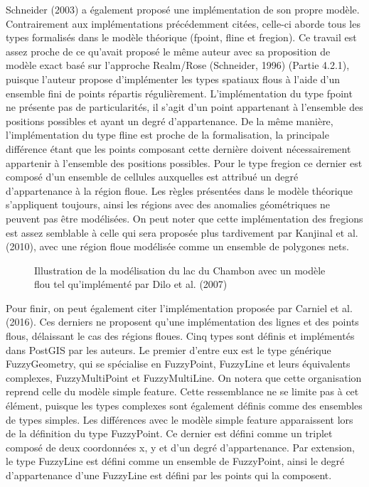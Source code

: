 Schneider (2003) a également proposé une implémentation de son propre
modèle. Contrairement aux implémentations précédemment citées,
celle-ci aborde tous les types formalisés dans le modèle théorique
(fpoint, fline et fregion). Ce travail est assez proche de ce qu’avait
proposé le même auteur avec sa proposition de modèle exact basé sur
l’approche Realm/Rose (Schneider, 1996) (Partie 4.2.1), puisque
l’auteur propose d’implémenter les types spatiaux flous à l’aide d’un
ensemble fini de points répartis régulièrement. L’implémentation du
type fpoint ne présente pas de particularités, il s’agit d’un point
appartenant à l’ensemble des positions possibles et ayant un degré
d’appartenance. De la même manière, l’implémentation du type fline est
proche de la formalisation, la principale différence étant que les
points composant cette dernière doivent nécessairement appartenir à
l’ensemble des positions possibles. Pour le type fregion ce dernier
est composé d’un ensemble de cellules auxquelles est attribué un degré
d’appartenance à la région floue. Les règles présentées dans le modèle
théorique s’appliquent toujours, ainsi les régions avec des anomalies
géométriques ne peuvent pas être modélisées. On peut noter que cette
implémentation des fregions est assez semblable à celle qui sera
proposée plus tardivement par Kanjinal et al. (2010), avec une région
floue modélisée comme un ensemble de polygones nets.

\begin{figure}
  \centering
  \caption{Illustration de la modélisation du lac du Chambon avec un modèle flou tel qu’implémenté par Dilo et al. (2007)}
  \label{fig:champ_dilo}
\end{figure}

Pour finir, on peut également citer l’implémentation proposée par
Carniel et al. (2016). Ces derniers ne proposent qu’une implémentation
des lignes et des points flous, délaissant le cas des régions
floues. Cinq types sont définis et implémentés dans PostGIS par les
auteurs. Le premier d’entre eux est le type générique FuzzyGeometry,
qui se spécialise en FuzzyPoint, FuzzyLine et leurs équivalents
complexes, FuzzyMultiPoint et FuzzyMultiLine. On notera que cette
organisation reprend celle du modèle simple feature. Cette
ressemblance ne se limite pas à cet élément, puisque les types
complexes sont également définis comme des ensembles de types
simples. Les différences avec le modèle simple feature apparaissent
lors de la définition du type FuzzyPoint. Ce dernier est défini comme
un triplet composé de deux coordonnées x, y et d’un degré
d’appartenance. Par extension, le type FuzzyLine est défini comme un
ensemble de FuzzyPoint, ainsi le degré d’appartenance d’une FuzzyLine
est défini par les points qui la composent.

